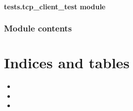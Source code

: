\documentclass[letterpaper,10pt,english]{sphinxmanual}
\begin{document}
\begin{fulllineitems}
\label{tests.run_model_optimisation:tests.run_model_optimisation.main}
\end{fulllineitems}



\subsubsection{tests.tcp\_client\_test module}
\label{tests.tcp_client_test:tests-tcp-client-test-module}\label{tests.tcp_client_test:module-tests.tcp_client_test}\label{tests.tcp_client_test::doc}

\subsection{Module contents}
\label{tests:module-contents}\label{tests:module-tests}

\chapter{Indices and tables}
\label{index:indices-and-tables}\begin{itemize}
\item {} 

\item {} 

\item {} 

\end{itemize}
\end{document}

